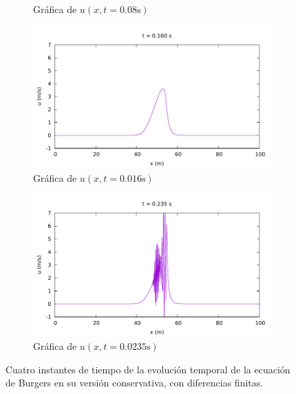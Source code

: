 \documentclass[12pt]{article}
\begin{document}
\begin{figure}[ht]
\begin{subfigure}[b]{0.4\textwidth}
			\caption*{Gráfica de $u(x,t=0.08\unit{\second})$}
			\label{fig:image2}
		\end{subfigure}
		\par\medskip
		\begin{subfigure}[b]{0.4\textwidth}
			\includegraphics[width=\textwidth]{../burgers1DDF/resultados-conservativa/frame032.pdf}
			\caption*{Gráfica de $u(x,t=0.016\unit{\second})$}
			\label{fig:image3}
		\end{subfigure}
		\hfill
		\begin{subfigure}[b]{0.4\textwidth}
			\includegraphics[width=\textwidth]{../burgers1DDF/resultados-conservativa/frame047.pdf}
			\caption*{Gráfica de $u(x,t=0.0235\unit{\second})$}
			\label{fig:image4}
		\end{subfigure}
		\caption{Cuatro instantes de tiempo de la evolución temporal de la ecuación de Burgers en su versión conservativa, con diferencias finitas.}
		\label{fig:instantes-conservativa}
	\end{figure}
	
\end{document}
